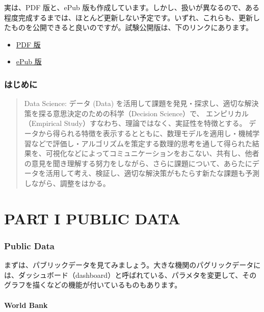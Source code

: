 \documentclass[
]{bxjsbook}
\providecommand{\tightlist}{%
  \setlength{\itemsep}{0pt}\setlength{\parskip}{0pt}}
\theoremstyle{definition}
\theoremstyle{definition}
\theoremstyle{definition}
\theoremstyle{definition}
\theoremstyle{remark}
\begin{document}
実は、PDF 版と、ePub 版も作成しています。しかし、扱いが異なるので、ある程度完成するまでは、ほとんど更新しない予定です。いずれ、これらも、更新したものを公開できると良いのですが。試験公開版は、下のリンクにあります。

\begin{itemize}
\tightlist
\item
  \href{https://icu-hsuzuki.github.io/ds4aj/ds4aj.pdf}{PDF 版}
\item
  \href{https://icu-hsuzuki.github.io/ds4aj/ds4aj.epub}{ePub 版}
\end{itemize}

\hypertarget{introduction}{%
\section{はじめに}\label{introduction}}

\begin{quote}
Data Science: データ (Data) を活用して課題を発見・探求し、適切な解決策を探る意思決定のための科学（Decision Science）で、 エンピリカル（Empirical Study）すなわち、理論ではなく、実証性を特徴とする。 データから得られる特徴を表示するとともに、数理モデルを適用し・機械学習などで評価し・アルゴリズムを策定する数理的思考を通して得られた結果を、可視化などによってコミュニケーションをおこない、共有し、他者の意見を聞き理解する努力をしながら、さらに課題について、あらたにデータを活用して考え、検証し、適切な解決策がもたらす新たな課題も予測しながら、調整をはかる。
\end{quote}

\hypertarget{part-part-i-public-data}{%
\part{PART I PUBLIC DATA}\label{part-part-i-public-data}}

\hypertarget{publicdata}{%
\section{Public Data}\label{publicdata}}

まずは、パブリックデータを見てみましょう。大きな機関のパグリックデータには、ダッシュボード（dashboard）と呼ばれている、パラメタを変更して、そのグラフを描くなどの機能が付いているものもあります。

\hypertarget{world-bank}{%
\subsection{World Bank}\label{world-bank}}
\end{document}
